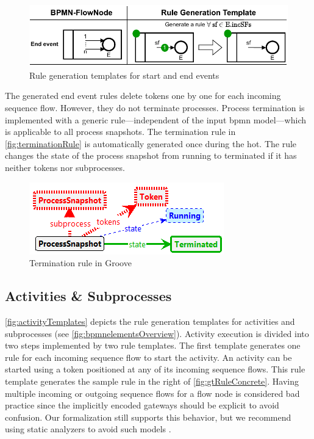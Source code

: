 \documentclass[runningheads]{llncs}
\begin{document}
\begin{figure}[ht]
    \centering
    \includegraphics[width=.8\textwidth]{images/end_template.pdf}
    \caption{Rule generation templates for start and end events}
    \label{fig:startAndEndTemplate}
\end{figure}
    
The generated end event rules delete tokens one by one for each incoming sequence flow.
However, they do not terminate processes.
Process termination is implemented with a generic rule---independent of the input \gls*{bpmn} model---which is applicable to all process snapshots.
The termination rule in \autoref{fig:terminationRule} is automatically generated once during the \gls*{hot}.
The rule changes the state of the process snapshot from running to terminated if it has neither tokens nor subprocesses.

\begin{figure}[ht]
    \centering
    \includegraphics[width=.5\textwidth]{images/terminate_groove.png}
    \caption{Termination rule in Groove}
    \label{fig:terminationRule}
\end{figure}

\subsection{Activities \& Subprocesses}

\autoref{fig:activityTemplates} depicts the rule generation templates for activities and subprocesses (see \autoref{fig:bpmnelementsOverview}).
Activity execution is divided into two steps implemented by two rule templates.
The first template generates one rule for each incoming sequence flow to start the activity.
An activity can be started using a token positioned at any of its incoming sequence flows.
This rule template generates the sample rule in the right of \autoref{fig:gtRuleConcrete}.
Having multiple incoming or outgoing sequence flows for a flow node is considered bad practice since the implicitly encoded gateways should be explicit to avoid confusion.
Our formalization still supports this behavior, but we recommend using static analyzers to avoid such models \cite{camundaservicesgmbhBpmnlint2023}.
\end{document}
